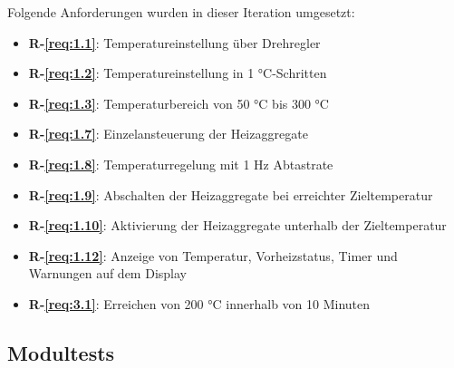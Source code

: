 \documentclass[a4paper,12pt]{article}
\begin{document}
Folgende Anforderungen wurden in dieser Iteration umgesetzt:

\begin{itemize}
    \item \label{req:1.1} \textbf{R-\ref{req:1.1}}: Temperatureinstellung über Drehregler
    \item \label{req:1.2} \textbf{R-\ref{req:1.2}}: Temperatureinstellung in 1 °C-Schritten
    \item \label{req:1.3} \textbf{R-\ref{req:1.3}}: Temperaturbereich von 50 °C bis 300 °C
    \item \label{req:1.7} \textbf{R-\ref{req:1.7}}: Einzelansteuerung der Heizaggregate
    \item \label{req:1.8} \textbf{R-\ref{req:1.8}}: Temperaturregelung mit 1 Hz Abtastrate
    \item \label{req:1.9} \textbf{R-\ref{req:1.9}}: Abschalten der Heizaggregate bei erreichter Zieltemperatur
    \item \label{req:1.10} \textbf{R-\ref{req:1.10}}: Aktivierung der Heizaggregate unterhalb der Zieltemperatur
    \item \label{req:1.12} \textbf{R-\ref{req:1.12}}: Anzeige von Temperatur, Vorheizstatus, Timer und Warnungen auf dem Display
    \item \label{req:3.1} \textbf{R-\ref{req:3.1}}: Erreichen von 200 °C innerhalb von 10 Minuten
\end{itemize}

\subsection{Modultests}
\end{document}

